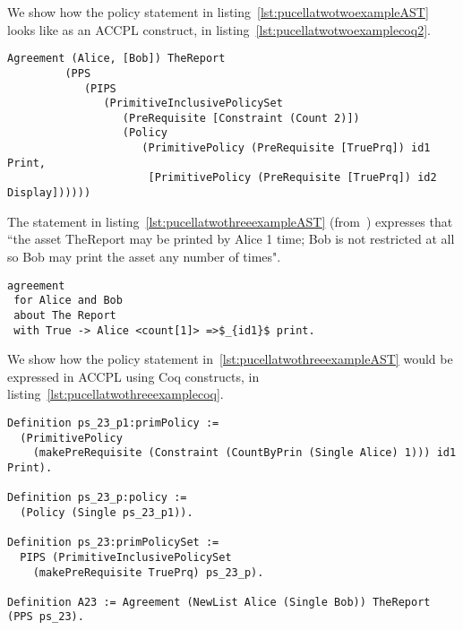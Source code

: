We show how the policy statement in listing~\ref{lst:pucellatwotwoexampleAST} looks like as an \ac{ACCPL} construct, in listing~\ref{lst:pucellatwotwoexamplecoq2}.

\begin{minipage}[c]{0.95\textwidth}
\begin{lstlisting}
Agreement (Alice, [Bob]) TheReport
         (PPS
            (PIPS
               (PrimitiveInclusivePolicySet
                  (PreRequisite [Constraint (Count 2)])
                  (Policy
                     (PrimitivePolicy (PreRequisite [TruePrq]) id1 Print,
                      [PrimitivePolicy (PreRequisite [TruePrq]) id2 Display])))))

\end{lstlisting}
\end{minipage} 


%

The statement in listing~\ref{lst:pucellatwothreeexampleAST} (from~\cite{pucella2006}) expresses that ``the asset TheReport may be printed by Alice 1 time; Bob is not restricted at all so Bob may print the asset any number of times".

\lstset{language=Pucella2006}
\begin{minipage}[c]{0.95\textwidth}
\begin{lstlisting}[frame=single, caption={Agreement of Example 2.3}, label={lst:pucellatwothreeexampleAST}, mathescape]
agreement
 for Alice and Bob 
 about The Report 
 with True -> Alice <count[1]> =>$_{id1}$ print.
\end{lstlisting}
\end{minipage} 

We show how the policy statement in~\ref{lst:pucellatwothreeexampleAST} would be expressed in \ac{ACCPL} using Coq constructs, in listing~\ref{lst:pucellatwothreeexamplecoq}.

\begin{minipage}[c]{0.95\textwidth}
\begin{lstlisting}
Definition ps_23_p1:primPolicy := 
  (PrimitivePolicy 
    (makePreRequisite (Constraint (CountByPrin (Single Alice) 1))) id1 Print).

Definition ps_23_p:policy := 
  (Policy (Single ps_23_p1)).

Definition ps_23:primPolicySet :=
  PIPS (PrimitiveInclusivePolicySet
    (makePreRequisite TruePrq) ps_23_p).

Definition A23 := Agreement (NewList Alice (Single Bob)) TheReport (PPS ps_23).
\end{lstlisting}
\end{minipage} 

